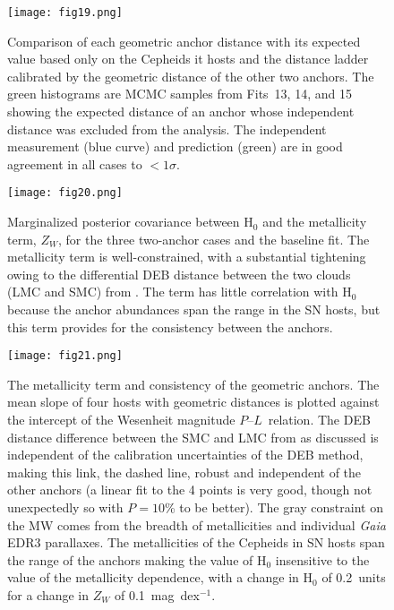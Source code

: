\documentclass[12pt]{aastex631}
\newcommand{\PLs}{$P$--$L$\ }
\begin{document}
\begin{figure}[h]
\begin{center}
\texttt{[image: fig19.png]}
\end{center}
\caption{\label{fg:anchors} Comparison of each geometric anchor distance with its expected value based only on the Cepheids it hosts and the distance ladder calibrated by the geometric distance of the other two anchors.  The green histograms are MCMC samples from Fits~13, 14, and 15 showing the expected distance of an anchor whose independent distance was excluded from the analysis.  The independent measurement (blue curve) and prediction (green) are in good agreement in all cases to $< 1\sigma$.  }
\end{figure}
  
\begin{figure}[h]
\begin{center}
\texttt{[image: fig20.png]}
\end{center}
\caption{\label{fg:h0zw} Marginalized posterior covariance between H$_0$ and the metallicity term, $Z_W$, for the three two-anchor cases and the baseline fit.  The metallicity term is well-constrained, with a substantial tightening owing to the differential DEB distance between the two clouds (LMC and SMC) from \citet{Graczyk:2020}.   The term has little correlation with H$_0$ because the anchor abundances span the range in the SN hosts, but this term provides for the consistency between the anchors.}
\end{figure}

\begin{figure}[h]  
\begin{center}
\texttt{[image: fig21.png]}
\end{center}
\caption{\label{fg:mety} The metallicity term and consistency of the geometric anchors.  The mean slope of four hosts with geometric distances is plotted against the intercept of the Wesenheit magnitude \PLs relation.  The DEB distance difference between the SMC and LMC from \citet{Graczyk:2020} as discussed is independent of the calibration uncertainties of the DEB method, making this link, the dashed line, robust and independent of the other anchors (a linear fit to the 4 points is very good, though not unexpectedly so with $P=10$\% to be better). The gray constraint on the MW comes from the breadth of metallicities and individual {\it Gaia} EDR3 parallaxes.  The metallicities of the Cepheids in SN hosts span the range of the anchors making the value of H$_0$ insensitive to the value of the metallicity dependence, with a change in H$_0$ of 0.2~units for a change in $Z_W$ of 0.1~mag~dex$^{-1}$. } 
\end{figure}
\end{document}
